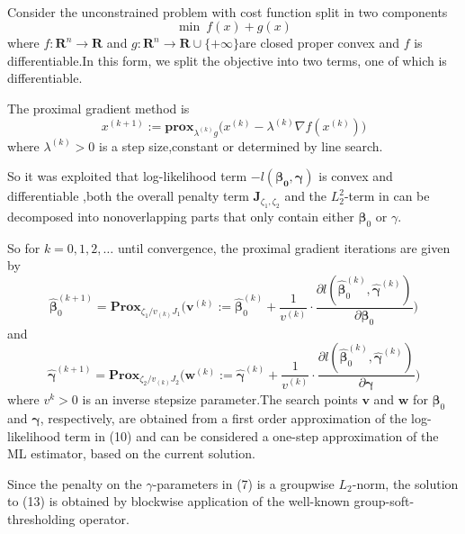 \documentclass[]{article}
\begin{document}
    \paragraph{}Consider the unconstrained problem with cost function split in two components
    \begin{equation}
    \mathop{\min}\ f(x)+g(x)
    \end{equation}
    where $f:\bm{R}^n\to\bm{R}$ and $g:\bm{R}^n\to \bm{R}\cup\{+\infty\}$are closed proper convex and $f$ is differentiable.In this form, we split the objective into two terms, one of which is differentiable.
    
    The proximal gradient method is
    \begin{equation}
    x^{(k+1)}:=\mathbf{prox}_{\lambda^{(k)}g}\Big(x^{(k)}-\lambda^{(k)}\nabla f(x^{(k)})\Big)
    \end{equation}
    where $\lambda^{(k)}>0$ is a step size,constant or determined by line search.
    
    So it was exploited that log-likelihood term $-l(\bm{\beta_0},\bm{\gamma})$ is convex and differentiable ,both the overall penalty term $\bm{J}_{\zeta_1,\zeta_2}$  and the $L_2^2$-term in can be decomposed into nonoverlapping parts that only contain either $\bm{\beta}_0$ or $\gamma$.
    
    So for $k=0,1,2,\dots$ until convergence, the proximal gradient iterations are given by
    \begin{equation}
    \bm{\hat{\beta}}_0^{(k+1)} = \mathbf{Prox}_{\zeta_1/v_{(k)}J_1}\bigg( \mathbf{v}^{(k)}:= \bm{\hat{\beta}}_0^{(k)}+\frac{1}{v^{(k)}} \cdot \frac{\partial l(\bm{\hat{\beta}}_0^{(k)},\bm{\hat{\gamma}}^{(k)})}{\partial \bm{\beta}_0}\bigg)
    \end{equation}
    and
    \begin{equation}
    \bm{\hat{\gamma}}^{(k+1)} = \mathbf{Prox}_{\zeta_2/v_{(k)}J_2}\bigg( \mathbf{w}^{(k)}:= \bm{\hat{\gamma}}^{(k)}+\frac{1}{v^{(k)}} \cdot \frac{\partial l(\bm{\hat{\beta}}_0^{(k)},\bm{\hat{\gamma}}^{(k)})}{\partial \bm{\gamma}}\bigg)
    \end{equation}
    where $v^{k}>0$ is an inverse stepsize parameter.The search points $\bm{v}$ and $\bm{w}$ for $\bm{\beta}_0$ and $\bm{\gamma}$, respectively, are obtained from a first order approximation of the log-likelihood term in (10) and can be considered a one-step approximation of the ML estimator, based on the current solution.
    
    Since the penalty on the $\gamma$-parameters in (7) is a groupwise $L_2$-norm, the solution to (13) is obtained by blockwise application of the well-known group-soft-thresholding operator.
    
\end{document}
